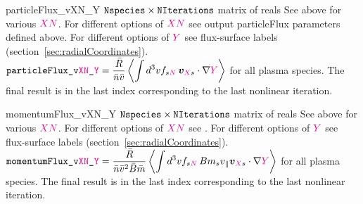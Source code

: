 \myhrule

{particleFlux_vXN_Y}
{$\text{\ttfamily Nspecies} \times \text{\ttfamily NIterations}$ matrix of reals}
{See above for various $\textcolor{magenta}{XN}$.}
{For different options of $\textcolor{magenta}{XN}$ see output {\ttfamily particleFlux} parameters defined above. 
For different options of $\textcolor{magenta}{Y}$ see flux-surface labels (section~\ref{sec:radialCoordinates}). 
$\displaystyle \text{\ttfamily particleFlux\_v\textcolor{magenta}{XN}\_\textcolor{magenta}{Y}} = \frac{\bar{R}}{\bar{n} \bar{v}} \left\langle \int d^3v f_{s\textcolor{magenta}{N}} \, \bm{v}_{\textcolor{magenta}{X}s} \cdot \nabla \textcolor{magenta}{Y}\right\rangle$ for all plasma species. The final result is in the last index corresponding to the last nonlinear iteration.}

\myhrule

%

{momentumFlux_vXN_Y}
{$\text{\ttfamily Nspecies} \times \text{\ttfamily NIterations}$ matrix of reals}
{See above for various $\textcolor{magenta}{XN}$.}
{For different options of $\textcolor{magenta}{XN}$ see  
.
For different options of $\textcolor{magenta}{Y}$ see flux-surface labels (section~\ref{sec:radialCoordinates}). 
$\displaystyle \text{\ttfamily momentumFlux\_v\textcolor{magenta}{XN}\_\textcolor{magenta}{Y}} = \frac{\bar{R}}{\bar{n} \bar{v}^2 \bar{B} \bar{m}} \left\langle \int d^3v f_{s\textcolor{magenta}{N}} \, B m_s v_{\|} \bm{v}_{\textcolor{magenta}{X}s} \cdot \nabla \textcolor{magenta}{Y}\right\rangle$ for all plasma species. The final result is in the last index corresponding to the last nonlinear iteration.}

\myhrule

